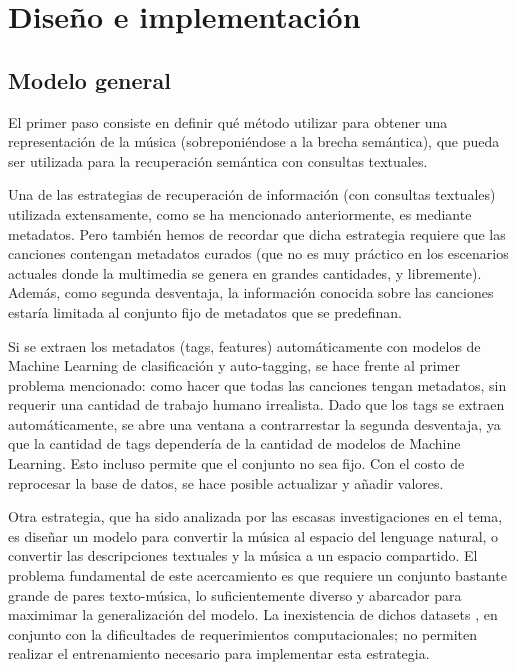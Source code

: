 \chapter{Diseño e implementación}
\label{chap:design-implem}
\section{Modelo general}
\label{sec:design}
El primer paso consiste en definir qué método utilizar para obtener una representación de la música (sobreponiéndose a la brecha semántica), que pueda ser utilizada para la recuperación semántica con consultas textuales.

Una de las estrategias de recuperación de información (con consultas textuales) utilizada extensamente, como se ha mencionado anteriormente, es mediante metadatos. Pero también hemos de recordar que dicha estrategia requiere que las canciones contengan metadatos curados (que no es muy práctico en los escenarios actuales donde la multimedia se genera en grandes cantidades, y libremente). Además, como segunda desventaja, la información conocida sobre las canciones estaría limitada al conjunto fijo de metadatos que se predefinan. 

Si se extraen los metadatos (tags, features) automáticamente con modelos de Machine Learning de clasificación y auto-tagging, se hace frente al primer problema mencionado: como hacer que todas las canciones tengan metadatos, sin requerir una cantidad de trabajo humano irrealista. Dado que los tags se extraen automáticamente, se abre una ventana a contrarrestar la segunda desventaja, ya que la cantidad de tags dependería de la cantidad de modelos de Machine Learning. Esto incluso permite que el conjunto no sea fijo. Con el costo de reprocesar la base de datos, se hace posible actualizar y añadir valores.

Otra estrategia, que ha sido analizada por las escasas investigaciones en el tema, es diseñar un modelo para convertir la música al espacio del lenguage natural, o convertir las descripciones textuales y la música a un espacio compartido. El problema fundamental de este acercamiento es que requiere un conjunto bastante grande de pares texto-música, lo suficientemente diverso y abarcador para maximimar la generalización del modelo. La inexistencia de dichos datasets \cite{Simonetta2019MultimodalMI, Huang2022MuLanAJ, Manco2022ContrastiveAL}, en conjunto con la dificultades de requerimientos computacionales; no permiten realizar el entrenamiento necesario para implementar esta estrategia. 

